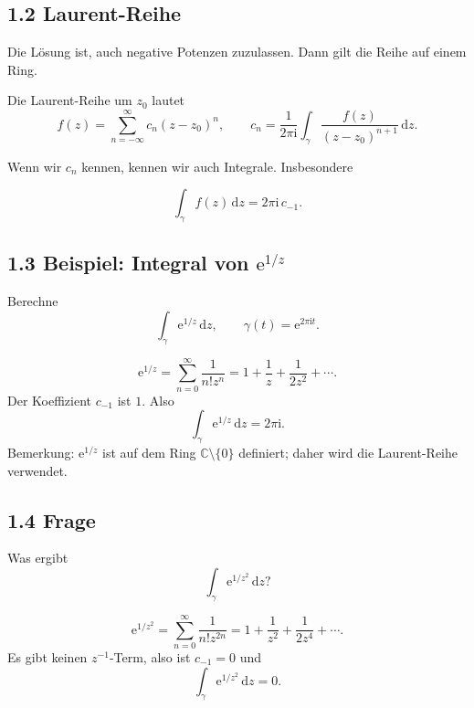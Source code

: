 \documentclass[11pt,a4paper]{article}
\newcommand{\C}{\mathbb C}
\newcommand{\ii}{\mathrm i}
\newcommand{\ee}{\mathrm e}
\newcommand{\dd}{\,\mathrm d}
\begin{document}
\subsection{1.2 Laurent-Reihe}
Die Lösung ist, auch negative Potenzen zuzulassen. Dann gilt die Reihe auf einem Ring.

\begin{importantbox}
Die Laurent-Reihe um $z_0$ lautet
\[
f(z)=\sum_{n=-\infty}^{\infty}c_n(z-z_0)^n,
\qquad
c_n=\frac1{2\pi\ii}\int_\gamma\frac{f(z)}{(z-z_0)^{n+1}}\dd z.
\]
\end{importantbox}
Wenn wir $c_n$ kennen, kennen wir auch Integrale. Insbesondere
\begin{importantbox}
\[
\int_\gamma f(z)\dd z=2\pi\ii\,c_{-1}.
\]
\end{importantbox}

\begin{center}
\end{center}

\subsection{1.3 Beispiel: Integral von $\ee^{1/z}$}
\begin{beispielbox}
Berechne
\[
\int_\gamma \ee^{1/z}\dd z,
\qquad \gamma(t)=\ee^{2\pi\ii t}.
\]
\end{beispielbox}
\[
\ee^{1/z}=\sum_{n=0}^{\infty}\frac{1}{n!z^n}
=1+\frac1z+\frac1{2z^2}+\cdots.
\]
Der Koeffizient $c_{-1}$ ist $1$. Also
\[
\int_\gamma \ee^{1/z}\dd z=2\pi\ii.
\]
Bemerkung: $\ee^{1/z}$ ist auf dem Ring $\C\setminus\{0\}$ definiert; daher wird die Laurent-Reihe verwendet.

\subsection{1.4 Frage}
\begin{fragebox}
Was ergibt
\[
\int_\gamma \ee^{1/z^2}\dd z?
\]
\end{fragebox}
\begin{antwortbox}
\[
\ee^{1/z^2}=\sum_{n=0}^{\infty}\frac1{n!z^{2n}}
=1+\frac1{z^2}+\frac1{2z^4}+\cdots.
\]
Es gibt keinen $z^{-1}$-Term, also ist $c_{-1}=0$ und
\[
\int_\gamma \ee^{1/z^2}\dd z=0.
\]
\end{antwortbox}
\end{document}
